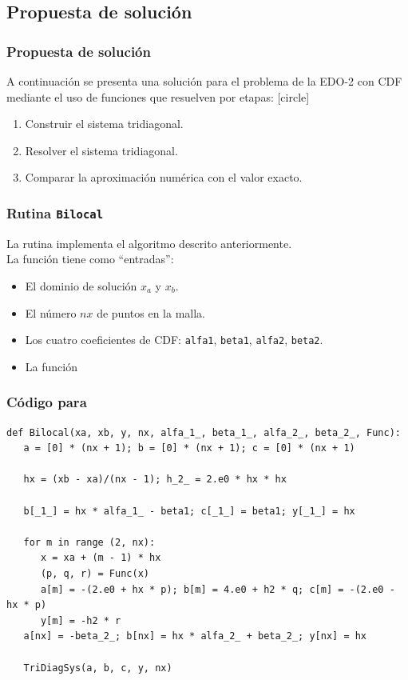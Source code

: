 \subsection{Propuesta de solución}
\begin{frame}
\frametitle{Propuesta de solución}
A continuación se presenta una solución para el problema de la EDO-2 con CDF mediante el uso de funciones que resuelven por etapas:
[circle]
\begin{enumerate}[<+->]
\item Construir el sistema tridiagonal.
\item Resolver el sistema tridiagonal.
\item Comparar la aproximación numérica con el valor exacto.
\end{enumerate}
\end{frame}
\begin{frame}
\frametitle{Rutina \texttt{Bilocal}}
La rutina  implementa el algoritmo descrito anteriormente.
\\
La función tiene como \enquote{entradas}:
\begin{itemize}
\item El dominio de solución $x_{a}$ y $x_{b}$.
\item El número $nx$ de puntos en la malla.
\item Los cuatro coeficientes de CDF: \texttt{alfa1}, \texttt{beta1}, \texttt{alfa2}, \texttt{beta2}.
\item La función 
 \end{itemize}
\end{frame}
\begin{frame}
\frametitle{Código para }
\begin{lstlisting}[caption=Función Bilocal, style=FormattedNumber, basicstyle=\linespread{1.1}\ttfamily=\small, columns=fullflexible]
def Bilocal(xa, xb, y, nx, alfa_1_, beta_1_, alfa_2_, beta_2_, Func):
   a = [0] * (nx + 1); b = [0] * (nx + 1); c = [0] * (nx + 1)

   hx = (xb - xa)/(nx - 1); h_2_ = 2.e0 * hx * hx
                                                  
   b[_1_] = hx * alfa_1_ - beta1; c[_1_] = beta1; y[_1_] = hx

   for m in range (2, nx):
      x = xa + (m - 1) * hx
      (p, q, r) = Func(x)
      a[m] = -(2.e0 + hx * p); b[m] = 4.e0 + h2 * q; c[m] = -(2.e0 - hx * p)
      y[m] = -h2 * r
   a[nx] = -beta_2_; b[nx] = hx * alfa_2_ + beta_2_; y[nx] = hx

   TriDiagSys(a, b, c, y, nx)
\end{lstlisting}
\end{frame}
